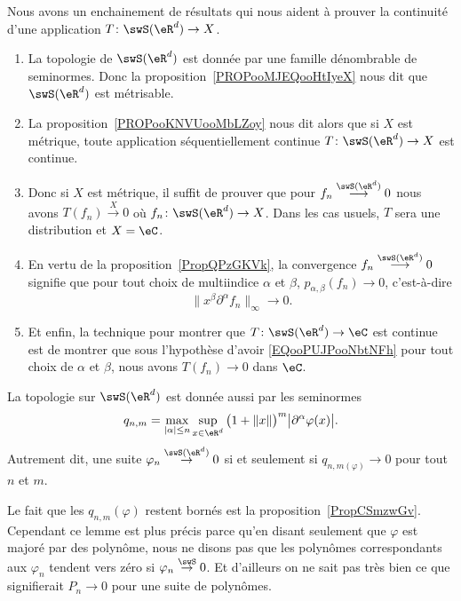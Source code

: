 \begin{normaltext}      \label{NORMooVQESooRwJShl}
Nous avons un enchainement de résultats qui nous aident à prouver la continuité d'une application \( T\colon \swS(\eR^d)\to X\).
\begin{enumerate}
    \item
        La topologie de \( \swS(\eR^d)\) est donnée par une famille dénombrable de seminormes. Donc la proposition~\ref{PROPooMJEQooHtIyeX} nous dit que \( \swS(\eR^d)\) est métrisable.
    \item
        La proposition~\ref{PROPooKNVUooMbLZoy} nous dit alors que si \( X\) est métrique, toute application séquentiellement continue \( T\colon \swS(\eR^d)\to X\) est continue.
    \item
        Donc si \( X\) est métrique, il suffit de prouver que pour \( f_n\stackrel{\swS(\eR^d)}{\longrightarrow}0\) nous avons \( T(f_n)\stackrel{X}{\longrightarrow} 0\) où \( f_n\colon \swS(\eR^d)\to X\). Dans les cas usuels, \( T\) sera une distribution et \( X=\eC\).
    \item
        En vertu de la proposition~\ref{PropQPzGKVk}, la convergence \( f_n\stackrel{\swS(\eR^d)}{\longrightarrow}0\) signifie que pour tout choix de multiindice \( \alpha\) et \( \beta\),  \( p_{\alpha,\beta}(f_n)\to 0\), c'est-à-dire
        \begin{equation}        \label{EQooPUJPooNbtNFh}
            \| x^{\beta}\partial^{\alpha}f_n \|_{\infty}\to 0.
        \end{equation}
    \item
        Et enfin, la technique pour montrer que \( T\colon \swS(\eR^d)\to \eC\) est continue est de montrer que sous l'hypothèse d'avoir \eqref{EQooPUJPooNbtNFh} pour tout choix de \( \alpha\) et \( \beta\), nous avons \( T(f_n)\to 0\) dans \( \eC\).
\end{enumerate}
\end{normaltext}

\begin{lemma}   \label{LemRJhCbkO}
    La topologie sur \( \swS(\eR^d)\) est donnée aussi par les seminormes
    \begin{equation}
        q_{n,m}=\max_{| \alpha |\leq n}\sup_{x\in \eR^d}\big( 1+\| x \| \big)^m\big| \partial^{\alpha}\varphi(x) \big|.
    \end{equation}
    Autrement dit, une suite \( \varphi_n\stackrel{\swS(\eR^d)}{\to}0\) si et seulement si \( q_{n,m(\varphi)}\to 0\) pour tout \( n\) et \( m\).
\end{lemma}
Le fait que les \( q_{n,m}(\varphi)\) restent bornés est la proposition~\ref{PropCSmzwGv}. Cependant ce lemme est plus précis parce qu'en disant seulement que \( \varphi\) est majoré par des polynôme, nous ne disons pas que les polynômes correspondants aux \( \varphi_n\) tendent vers zéro si \( \varphi_n\stackrel{\swS}{\to}0\). Et d'ailleurs on ne sait pas très bien ce que signifierait \( P_n\to 0\) pour une suite de polynômes.

